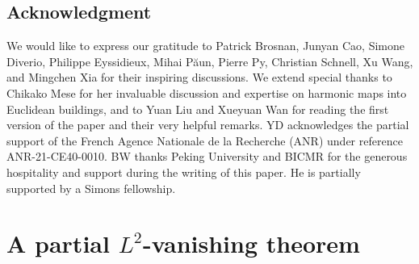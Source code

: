 \documentclass[11pt,a4paper,english]{smfart}
\theoremstyle{plain}
\theoremstyle{definition}
\newtheorem{definition}[theorem]{Definition}
\theoremstyle{plain}
\begin{document}
	\subsection{Acknowledgment}    We would like to express our gratitude to Patrick Brosnan, Junyan Cao, Simone Diverio, Philippe Eyssidieux, Mihai P\u{a}un, Pierre Py, Christian Schnell,  Xu Wang, and Mingchen Xia for their inspiring discussions. We extend special thanks to Chikako Mese for her invaluable discussion  and expertise on harmonic maps into Euclidean buildings, and  to Yuan Liu and Xueyuan Wan for reading the first version of the paper and their very helpful remarks.   YD acknowledges the partial support of the French Agence Nationale de la Recherche (ANR) under reference ANR-21-CE40-0010. BW thanks Peking University and BICMR for the generous hospitality and support during the writing of this paper. He is partially supported by a Simons fellowship.
	
	\section{A partial $L^2$-vanishing theorem}
 \label{sec:kp}
	
\end{document}
